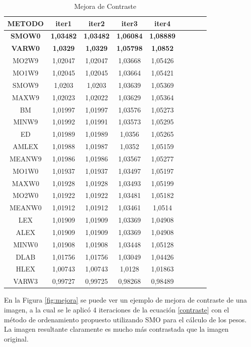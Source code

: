 \begin{table}
\caption{ Mejora de Contraste}
\label{tab:EXP_N1}
\begin{tabular}{ccccccccc}
\hline METODO& iter1&iter2&iter3&iter4\\
\hline  \textbf{SMOW0}& \textbf{1,03482}& \textbf{1,03482}& \textbf{1,06084}& \textbf{1,08889}\\
\hline  \textbf{VARW0}& \textbf{1,0329}& \textbf{1,0329}& \textbf{1,05798}& \textbf{1,0852}\\
\hline MO2W9&1,02047&1,02047&1,03668&1,05426\\
\hline MO1W9&1,02045&1,02045&1,03664&1,05421\\
\hline SMOW9&1,0203&1,0203&1,03639&1,05369\\
\hline MAXW9&1,02023&1,02022&1,03629&1,05364\\
\hline BM&1,01997&1,01997&1,03576&1,05273\\
\hline MINW9&1,01992&1,01991&1,03573&1,05295\\
\hline ED&1,01989&1,01989&1,0356&1,05265\\
\hline AMLEX&1,01988&1,01987&1,0352&1,05159\\
\hline MEANW9&1,01986&1,01986&1,03567&1,05277\\
\hline MO1W0&1,01937&1,01937&1,03497&1,05197\\
\hline MAXW0&1,01928&1,01928&1,03493&1,05199\\
\hline MO2W0&1,01922&1,01922&1,03481&1,05182\\
\hline MEANW0&1,01912&1,01912&1,03461&1,0514\\
\hline LEX&1,01909&1,01909&1,03369&1,04908\\
\hline ALEX&1,01909&1,01909&1,03369&1,04908\\
\hline MINW0&1,01908&1,01908&1,03448&1,05128\\
\hline DLAB&1,01756&1,01756&1,03049&1,04426\\
\hline HLEX&1,00743&1,00743&1,0128&1,01863\\
\hline VARW3&0,99727&0,99725&0,98268&0,98489\\

\hline

\end{tabular}
\end{table}

En la Figura \ref{fig:mejora} se puede ver un ejemplo de mejora de contraste de una imagen, a la cual se le aplicó 4 iteraciones de la ecuación \ref{contraste} con el método de ordenamiento propuesto utilizando SMO para el cálculo de los pesos. La imagen resultante claramente es mucho más contrastada que la imagen original. 
 
